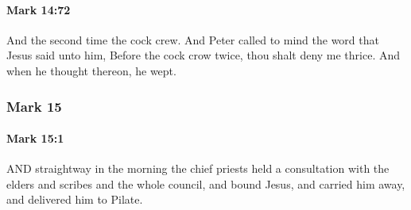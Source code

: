 		\paragraph{Mark 14:72} %
			\label{MARK-14-72}

			And the second time the cock crew. And Peter called to mind the word that Jesus said unto him, Before the cock crow twice, thou shalt deny me thrice. And when he thought thereon, he wept.

			\begin{framed}
			\scriptsize
				\begin{compactdesc}
					\item[SBLG] 
				\end{compactdesc}
			\end{framed}

	\subsubsection{Mark 15} %
		\label{MARK-15}
		
		\paragraph{Mark 15:1} %
			\label{MARK-15-1}

			AND straightway in the morning the chief priests held a consultation with the elders and scribes and the whole council, and bound Jesus, and carried him away, and delivered him to Pilate.

